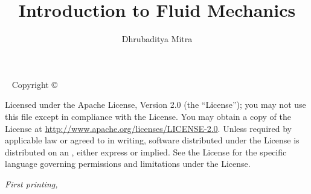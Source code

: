 \documentclass{tufte-book} %
\title{Introduction to Fluid Mechanics} %
\author[]{Dhrubaditya Mitra} %
\begin{document}
\frontmatter
\thispagestyle{empty}
\vfill
\maketitle %
\newpage
\begin{fullwidth}
~\vfill
\thispagestyle{empty}
\setlength{\parindent}{0pt}
\setlength{\parskip}{\baselineskip}
Copyright \copyright\ \the\year\ \thanklessauthor
\par{}
\par{}

\par Licensed under the Apache License, Version 2.0 (the ``License''); you may not use this file except in compliance with the License. You may obtain a copy of the License at \url{http://www.apache.org/licenses/LICENSE-2.0}. Unless required by applicable law or agreed to in writing, software distributed under the License is distributed on an , either express or implied. See the License for the specific language governing permissions and limitations under the License.
\par\textit{First printing, \monthyear}
\end{fullwidth}
\tableofcontents %
\end{document}
